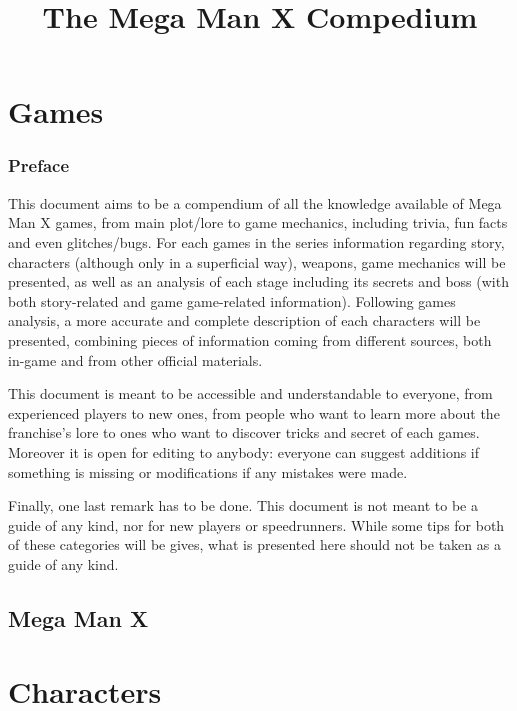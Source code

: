 \documentclass[openany]{report}
\title{The Mega Man X Compedium}
\begin{document}
\begin{titlepage}
	\maketitle
	\thispagestyle{empty}
\end{titlepage}

\tableofcontents
\part{Games}
	\section*{Preface}
	This document aims to be a compendium of all the knowledge available of Mega Man X games, from main plot/lore to game mechanics, including trivia, fun facts and even glitches/bugs. For each games in the series information regarding story, characters (although only in a superficial way), weapons, game mechanics will be presented, as well as an analysis of each stage including its secrets and boss (with both story-related and game game-related information). Following games analysis, a more accurate and complete description of each characters will be presented, combining pieces of information coming from different sources, both in-game and from other official materials.

	This document is meant to be accessible and understandable to everyone, from experienced players to new ones, from people who want to learn more about the franchise's lore to ones who want to discover tricks and secret of each games. Moreover it is open for editing to anybody: everyone can suggest additions if something is missing or modifications if any mistakes were made.
	
	Finally, one last remark has to be done. This document is not meant to be a guide of any kind, nor for new players or speedrunners. While some tips for both of these categories will be gives, what is presented here should not be taken as a guide of any kind.

\chapter{Mega Man X}
	

\part{Characters}
\end{document}
